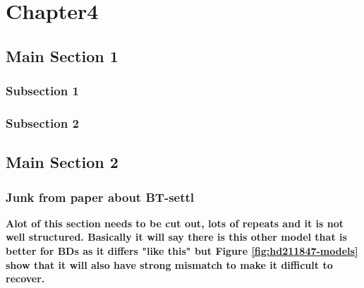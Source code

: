 
\chapter{Chapter4}  %

\label{cha:companion-recovery}


\section{Main Section 1}



\subsection{Subsection 1}



\subsection{Subsection 2}


\section{Main Section 2}




\subsection{Junk from paper about BT-settl}


\textbf{Alot of this section needs to be cut out, lots of repeats and it is not well structured. Basically it will say there is this other model that is better for BDs as it differs "like this" but Figure \ref{fig:hd211847-models} show that it will also have strong mismatch to make it difficult to recover.}


